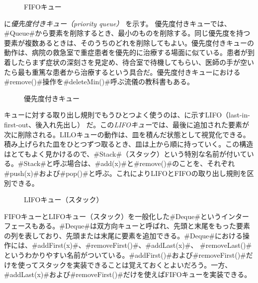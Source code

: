 \begin{figure}
  \caption{FIFOキュー}
\end{figure}

に\emph{優先度付きキュー（priority queue）}%
%
%
%
を示す。
優先度付きキューでは、#Queue#から要素を削除するとき、最小のものを削除する。同じ優先度を持つ要素が複数あるときは、そのうちのどれを削除してもよい。優先度付きキューの動作は、病院の救急室で重症患者を優先的に治療する場面に似ている。患者が到着したらまず症状の深刻さを見定め、待合室で待機してもらい、医師の手が空いたら最も重篤な患者から治療するという具合だ。優先度付きキューにおける#remove()#操作を#deleteMin()#呼ぶ流儀の教科書もある。 %

\begin{figure}
  \caption{優先度付きキュー}
\end{figure}

キューに対する取り出し規則でもうひとつよく使うのは、に示すLIFO（last-in-first-out、後入れ先出し）
%
%
%
%
だ。この\emph{LIFOキュー}では、最後に追加された要素が次に削除される。LILOキューの動作は、皿を積んだ状態として視覚化できる。積み上げられた皿をひとつずつ取るとき、皿は上から順に持っていく。この構造はとてもよく見かけるので、#Stack#（スタック）という特別な名前が付いている。#Stack#と呼ぶ場合は、#add(x)#と#remove()#のことを、それぞれ#push(x)#および#pop()#と呼ぶ。これによりLIFOとFIFOの取り出し規則を区別できる。

\begin{figure}
  \caption{LIFOキュー（スタック）}
\end{figure}

FIFOキューとLIFOキュー（スタック）を一般化した#Deque#というインターフェースもある。#Deque#は双方向キューと呼ばれ、先頭と末尾をもった要素の列を表しており、先頭または末尾に要素を追加できる。#Deque#における操作には、#addFirst(x)#、#removeFirst()#、#addLast(x)#、 #removeLast()#というわかりやすい名前がついている。#addFirst()#および#removeFirst()#だけを使ってスタックを実装できることは覚えておくとよいだろう。一方、#addLast(x)#および#removeFirst()#だけを使えばFIFOキューを実装できる。 %

